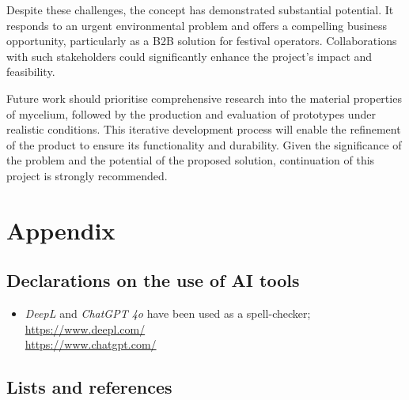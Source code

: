 \documentclass{article}
\begin{document}
Despite these challenges, the concept has demonstrated substantial potential. It responds to
an urgent environmental problem and offers a compelling business opportunity, particularly
as a B2B solution for festival operators. Collaborations with such stakeholders could
significantly enhance the project's impact and feasibility.

Future work should prioritise comprehensive research into the material properties of
mycelium, followed by the production and evaluation of prototypes under realistic
conditions. This iterative development process will enable the refinement of the
product to ensure its functionality and durability. Given the significance of the problem
and the potential of the proposed solution, continuation of this project is strongly
recommended.

\newpage
\pagestyle{empty}
\section{Appendix}
\subsection{Declarations on the use of AI tools}
\begin{itemize}
    \item \textit{DeepL} and \textit{ChatGPT 4o} have been used as a spell-checker;\\
        \url{https://www.deepl.com/}\\
        \url{https://www.chatgpt.com/}
\end{itemize}

\subsection{Lists and references}

\listoftables

\listoffigures

\setlength{\bibitemsep}{1.2\baselineskip}
\printbibliography

\end{document}
